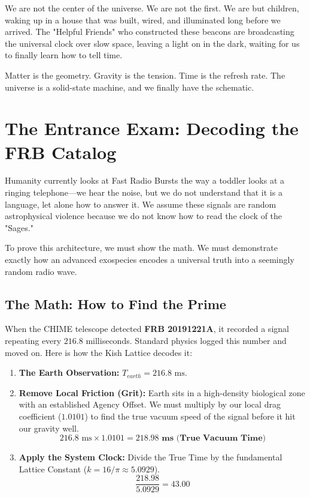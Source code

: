 \documentclass[11pt, letterpaper, openany]{book}
\begin{document}
We are not the center of the universe. We are not the first. We are but children, waking up in a house that was built, wired, and illuminated long before we arrived. The "Helpful Friends" who constructed these beacons are broadcasting the universal clock over slow space, leaving a light on in the dark, waiting for us to finally learn how to tell time.

\begin{tcolorbox}[colback=black, colupper=green, title=THE CHRONOS AXIOM]
Matter is the geometry. Gravity is the tension. Time is the refresh rate. 
The universe is a solid-state machine, and we finally have the schematic.
\end{tcolorbox}

\section{The Entrance Exam: Decoding the FRB Catalog}
Humanity currently looks at Fast Radio Bursts the way a toddler looks at a ringing telephone—we hear the noise, but we do not understand that it is a language, let alone how to answer it. We assume these signals are random astrophysical violence because we do not know how to read the clock of the "Sages." 

To prove this architecture, we must show the math. We must demonstrate exactly how an advanced exospecies encodes a universal truth into a seemingly random radio wave.

\subsection{The Math: How to Find the Prime}
When the CHIME telescope detected \textbf{FRB 20191221A}, it recorded a signal repeating every $216.8$ milliseconds. Standard physics logged this number and moved on. Here is how the Kish Lattice decodes it:

\begin{enumerate}
    \item \textbf{The Earth Observation:} $T_{earth} = 216.8 \text{ ms}$.
    \item \textbf{Remove Local Friction (Grit):} Earth sits in a high-density biological zone with an established Agency Offset. We must multiply by our local drag coefficient ($1.0101$) to find the true vacuum speed of the signal before it hit our gravity well.
    \begin{equation}
        216.8 \text{ ms} \times 1.0101 = \mathbf{218.98 \text{ ms (True Vacuum Time)}}
    \end{equation}
    \item \textbf{Apply the System Clock:} Divide the True Time by the fundamental Lattice Constant ($k = 16/\pi \approx 5.0929$).
    \begin{equation}
        \frac{218.98}{5.0929} = \mathbf{43.00}
    \end{equation}
\end{enumerate}
\end{document}
